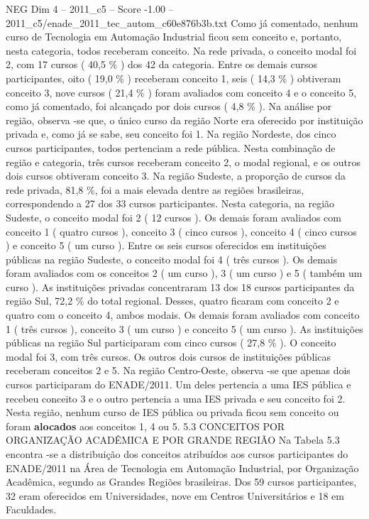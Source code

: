 \begin{textsample}{NEG Dim 4 – 2011\_c5 – Score -1.00 – 2011\_c5/enade\_2011\_tec\_autom\_c60e876b3b.txt}
Como já comentado, nenhum curso de Tecnologia em Automação Industrial ficou sem conceito e, portanto, nesta categoria, todos receberam conceito.
Na rede privada, o conceito modal foi 2, com 17 cursos ( 40,5 \% ) dos 42 da categoria.
Entre os demais cursos participantes, oito ( 19,0 \% ) receberam conceito 1, seis ( 14,3 \% ) obtiveram conceito 3, nove cursos ( 21,4 \% ) foram avaliados com conceito 4 e o conceito 5, como já comentado, foi alcançado por dois cursos ( 4,8 \% ).
Na análise por região, observa -se que, o único curso da região Norte era oferecido por instituição privada e, como já se sabe, seu conceito foi 1.
Na região Nordeste, dos cinco cursos participantes, todos pertenciam a rede pública.
Nesta combinação de região e categoria, três cursos receberam conceito 2, o modal regional, e os outros dois cursos obtiveram conceito 3.
Na região Sudeste, a proporção de cursos da rede privada, 81,8 \%, foi a mais elevada dentre as regiões brasileiras, correspondendo a 27 dos 33 cursos participantes.
Nesta categoria, na região Sudeste, o conceito modal foi 2 ( 12 cursos ).
Os demais foram avaliados com conceito 1 ( quatro cursos ), conceito 3 ( cinco cursos ), conceito 4 ( cinco cursos ) e conceito 5 ( um curso ).
Entre os seis cursos oferecidos em instituições públicas na região Sudeste, o conceito modal foi 4 ( três cursos ).
Os demais foram avaliados com os conceitos 2 ( um curso ), 3 ( um curso ) e 5 ( também um curso ).
As instituições privadas concentraram 13 dos 18 cursos participantes da região Sul, 72,2 \% do total regional.
Desses, quatro ficaram com conceito 2 e quatro com o conceito 4, ambos modais.
Os demais foram avaliados com conceito 1 ( três cursos ), conceito 3 ( um curso ) e conceito 5 ( um curso ).
As instituições públicas na região Sul participaram com cinco cursos ( 27,8 \% ).
O conceito modal foi 3, com três cursos.
Os outros dois cursos de instituições públicas receberam conceitos 2 e 5.
Na região Centro-Oeste, observa -se que apenas dois cursos participaram do ENADE/2011.
Um deles pertencia a uma IES pública e recebeu conceito 3 e o outro pertencia a uma IES privada e seu conceito foi 2.
Nesta região, nenhum curso de IES pública ou privada ficou sem conceito ou foram \textbf{alocados} aos conceitos 1, 4 ou 5. 5.3 CONCEITOS POR ORGANIZAÇÃO ACADÊMICA E POR GRANDE REGIÃO Na Tabela 5.3 encontra -se a distribuição dos conceitos atribuídos aos cursos participantes do ENADE/2011 na Área de Tecnologia em Automação Industrial, por Organização Acadêmica, segundo as Grandes Regiões brasileiras.
Dos 59 cursos participantes, 32 eram oferecidos em Universidades, nove em Centros Universitários e 18 em Faculdades.

\end{textsample}
